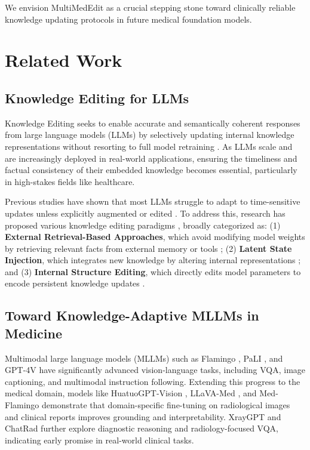 \documentclass[letterpaper]{article} %
\begin{document}
We envision MultiMedEdit as a crucial stepping stone toward clinically reliable knowledge updating protocols in future medical foundation models.

\section{Related Work}

\subsection{Knowledge Editing for LLMs}

Knowledge Editing seeks to enable accurate and semantically coherent responses from large language models (LLMs) by selectively updating internal knowledge representations without resorting to full model retraining \citep{yao2023editing}. As LLMs scale and are increasingly deployed in real-world applications, ensuring the timeliness and factual consistency of their embedded knowledge becomes essential, particularly in high-stakes fields like healthcare.

Previous studies have shown that most LLMs struggle to adapt to time-sensitive updates unless explicitly augmented or edited \citep{li2024kne,wu2024updating,dhingra2022timeaware}. To address this, research has proposed various knowledge editing paradigms \citep{comprehensive}, broadly categorized as: (1) \textbf{External Retrieval-Based Approaches}, which avoid modifying model weights by retrieving relevant facts from external memory or tools \citep{ike,serac,li2025mindbridge,lte}; (2) \textbf{Latent State Injection}, which integrates new knowledge by altering internal representations \citep{grace,melo,lora,qlora,adalora}; and (3) \textbf{Internal Structure Editing}, which directly edits model parameters to encode persistent knowledge updates \citep{rome,memit,mend,alphaedit,o-edit,feng2025geoedit}.

\subsection{Toward Knowledge-Adaptive MLLMs in Medicine}

Multimodal large language models (MLLMs) such as Flamingo \citep{alayrac2022flamingo}, PaLI \citep{chen2022pali}, and GPT-4V \citep{yang2023dawn} have significantly advanced vision-language tasks, including VQA, image captioning, and multimodal instruction following. Extending this progress to the medical domain, models like HuatuoGPT-Vision \citep{chen2024huatuogpt}, LLaVA-Med \citep{li2023llavamed}, and Med-Flamingo \citep{boger2023medflamingo} demonstrate that domain-specific fine-tuning on radiological images and clinical reports improves grounding and interpretability. XrayGPT \citep{zhang2023xraygpt} and ChatRad \citep{huang2024chatrad} further explore diagnostic reasoning and radiology-focused VQA, indicating early promise in real-world clinical tasks.
\end{document}
